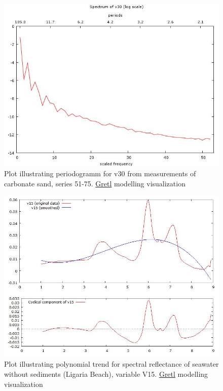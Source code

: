 \documentclass[10pt, a4paper]{article}
\begin{document}
\begin{appendices}
\begin{figure}[H]
	\begin{center}
		\includegraphics[scale=0.25]{G-period-sand30.jpg}
		\caption{Plot illustrating periodogramm for v30 from measurements of carbonate sand, series 51-75. \href{http://gretl.sourceforge.net/}{Gretl} modelling visualization­}
	\end{center}
	\label{fig:62}
\end{figure}
\pagebreak

\begin{figure}[H]
	\begin{center}
		\includegraphics[scale=0.32]{G-polynom-trend-wo.jpg}
		\caption{Plot illustrating polynomial trend for spectral reflectance of seawater without sediments (Ligaria Beach), variable V15. \href{http://gretl.sourceforge.net/}{Gretl} modelling visualization­}
	\end{center}
	\label{fig:63}
\end{figure}


\end{appendices}
\end{document}
